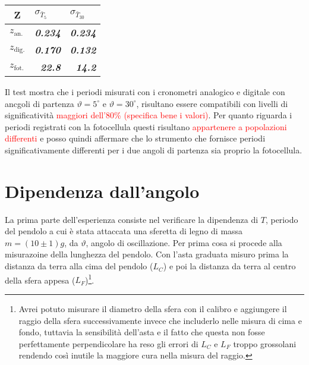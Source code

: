 \documentclass{article}
\begin{document}
\begin{table}[H]
	\centering
	\begin{tabular}{@{}lrr@{}}
		\toprule
		\multicolumn{1}{c}{Z} & \multicolumn{1}{l}{$\sigma_{\bar{T}_5}$} & \multicolumn{1}{l}{$\sigma_{\bar{T}_{30}}$} \\ \midrule
		$z_{\text{an.}}$      & \textit{\textbf{0.234}}                  & \textit{\textbf{0.234}}                   \\
		$z_{\text{dig.}}$     & \textit{\textbf{0.170}}                  & \textit{\textbf{0.132}}                   \\
		$z_{\text{fot.}}$     & \textit{\textbf{22.8}}                   & \textit{\textbf{14.2}}                    \\ \bottomrule
	\end{tabular}
\end{table}

Il test mostra che i periodi misurati con i cronometri analogico e digitale con ancgoli di partenza $\vartheta = 5^\circ$ e $\vartheta = 30^\circ$, risultano essere compatibili con livelli di significatività \textcolor{red}{maggiori dell'80\% (specifica bene i valori)}. Per quanto riguarda i periodi registrati con la fotocellula questi risultano \textcolor{red}{appartenere a popolazioni differenti} e posso quindi affermare che lo strumento che fornisce periodi significativamente differenti per i due angoli di partenza sia proprio la fotocellula.









\newpage
\section{Dipendenza dall’angolo}
La prima parte dell'esperienza consiste nel verificare la dipendenza di $T$, periodo del pendolo a cui è stata attaccata una sferetta di legno di massa $m = (10 \pm 1)g$, da $\vartheta$, angolo di oscillazione.  Per prima cosa si procede alla misurazoine della lunghezza del pendolo. Con l'asta graduata misuro prima la distanza da terra alla cima del pendolo ($L_C$) e poi la distanza da terra al centro della sfera appesa ($L_F$)\footnote{Avrei potuto misurare il diametro della sfera con il calibro e aggiungere il raggio della sfera successivamente invece che includerlo nelle misura di cima e fondo, tuttavia la sensibilità dell'asta e il fatto che questa non fosse perfettamente perpendicolare ha reso gli errori di $L_C$ e $L_F$ troppo grossolani rendendo così inutile la maggiore cura nella misura del raggio.}. 
\end{document}
